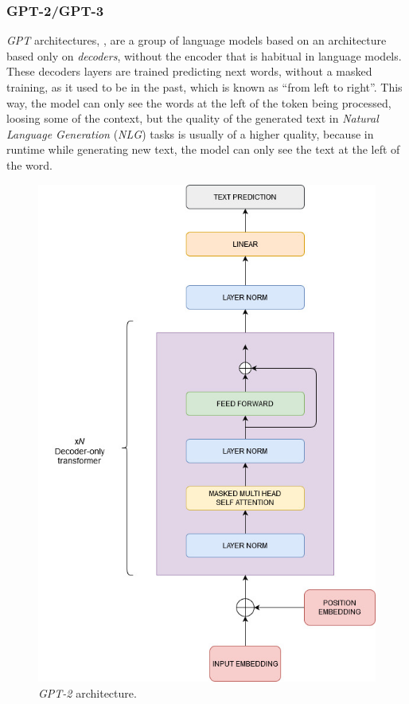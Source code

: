 \subsubsection{GPT-2/GPT-3}
\emph{GPT} architectures, \cite{Openai}\cite{Radford2019}\cite{Brown2020}, are a group of language models based on an architecture based only on \emph{decoders}, without the encoder that is habitual in language models. These decoders layers are trained predicting next words, without a masked training, as it used to be in the past, which is known as ``from left to right''. This way, the model can only see the words at the left of the token being processed, loosing some of the context, but the quality of the generated text in \emph{Natural Language Generation} (\emph{NLG}) tasks is usually of a higher quality, because in runtime while generating new text, the model can only see the text at the left of the word.
\begin{figure}[h!]
	\centering
	\includegraphics[scale=0.45]{images/gpt2}
	\caption{\emph{GPT-2} architecture.}
	\label{fig:gpt2}
\end{figure}
